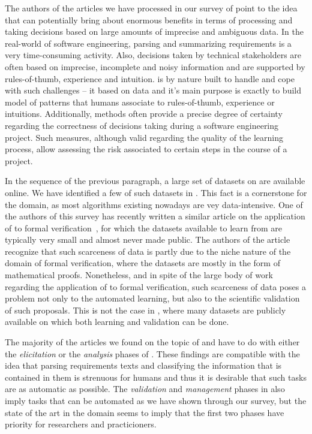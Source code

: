The authors of the articles we have processed in our survey of point
to the idea that \ML can potentially bring about enormous benefits in terms of
processing and taking decisions based on  large amounts of imprecise and
ambiguous data. In the real-world of software
engineering, parsing and summarizing requirements is a very time-consuming
activity. Also, decisions taken by technical stakeholders are often based on imprecise,
incomplete and noisy information and are supported by rules-of-thumb, experience
and intuition. \ML is by nature built to handle and cope with such challenges
-- it based on data and it's main purpose is exactly to build model of patterns
that humans associate to rules-of-thumb, experience or intuitions. Additionally,
\ML methods often provide a precise degree of certainty regarding the
correctness of decisions taking during a software engineering project. Such
measures, although valid regarding the quality of the learning process, allow
assessing the risk associated to certain steps in the course of a project.

In the sequence of the previous paragraph, a large set of datasets
on \RE are available online. We have identified a few of such datasets in
. This fact is a cornerstone for the domain, as most \ML
algorithms existing nowadays are vey data-intensive. One of the authors of this
survey has recently written a similar article on the application of \ML to
formal verification~\cite{AmLuBi:2018}, for which the datasets available
to learn from are typically very small and almost never made public. The authors
of the article recognize that such scarceness of data is partly due to the niche
nature of the domain of formal verification, where the datasets are mostly in
the form of mathematical proofs. Nonetheless, and in spite of the large body of
work regarding the application of \ML to formal verification, such scarceness of
data poses a problem not only to the automated learning, but also to the
scientific validation of such proposals. This is not the case in \RE, where many
datasets are publicly available on which both learning and validation can be
done.

The majority of the articles we found on the topic of \ML and \RE have to do
with either the \emph{elicitation} or the \emph{analysis} phases of \RE{}. These findings are compatible with the idea that parsing
requirements texts and classifying the information that is contained in them is
strenuous for humans and thus it is desirable that such tasks are as automatic
as possible. The \emph{validation} and \emph{management} phases in \RE also
imply tasks that can be automated as we have shown through our survey, but
the state of the art in the domain seems to imply that the first two phases
have priority for researchers and practicioners.

